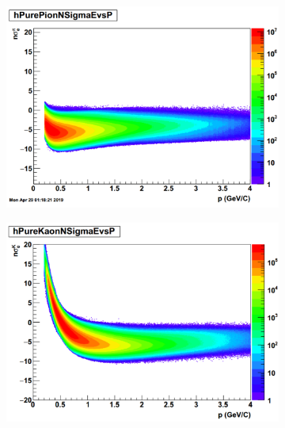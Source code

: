 \begin{figure}[h!]
    \centering
    \begin{subfigure}[h!]{0.43\textwidth}
            \includegraphics[width=\textwidth]{figures/Chapter4/PurePion.png}
            \caption{}
            \label{fig:PurePion}
    \end{subfigure}
    \begin{subfigure}[h!]{0.43\textwidth}
            \includegraphics[width=\textwidth]{figures/Chapter4/PureKaon.png}
            \caption{}
            \label{fig:PureKaon}
    \end{subfigure}


\end{figure}
